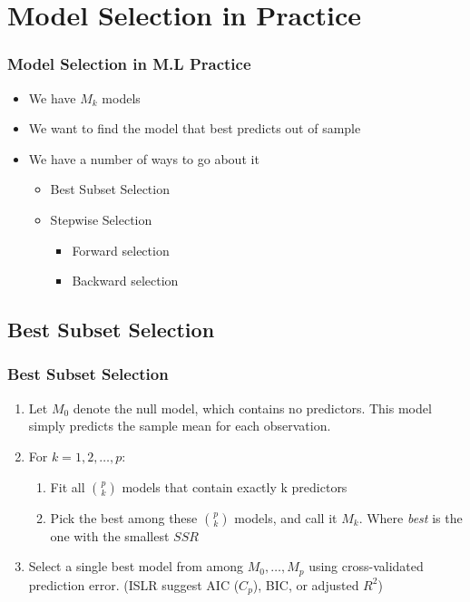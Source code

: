 \documentclass[
  shownotes,
  xcolor={svgnames},
  hyperref={colorlinks,citecolor=DarkBlue,linkcolor=DarkRed,urlcolor=DarkBlue}
  , aspectratio=169]{beamer}
\begin{document}
\section{Model Selection in Practice}
\begin{frame}[fragile]
\frametitle{Model Selection in M.L Practice}

\begin{itemize}
\item We have $M_k$ models 
\bigskip
\item We want to find the model that best predicts out of sample
\bigskip
\item We have a number of ways to go about it
\bigskip
\begin{itemize}
  \item Best Subset Selection
  \medskip
  \item Stepwise Selection
  \begin{itemize}
    \item Forward selection
    \medskip
    \item Backward selection
  \end{itemize}
\end{itemize}
\end{itemize}
\end{frame}
\subsection{Best Subset Selection}
\begin{frame}[fragile]
\frametitle{Best Subset Selection}
\begin{enumerate}
\item Let $M_0$ denote the null model, which contains no predictors. This model simply predicts the sample mean for each observation.
\bigskip
\item  For $k=1,2,\dots,p$:
\medskip
\begin{enumerate}
 \item Fit all $\binom{p}{k}$ models that contain exactly k predictors
 \medskip
 \item Pick the best among these $\binom{p}{k}$ models, and call it $M_k$. Where {\it best} is the one with the smallest $SSR$
\end{enumerate}
\bigskip
\item  Select a single best model from among $M_0,\dots, M_p$ using cross-validated prediction error. (ISLR suggest AIC ($C_p$), BIC, or adjusted $R^2$)
\end{enumerate}
 
 \end{frame}
\end{document}
